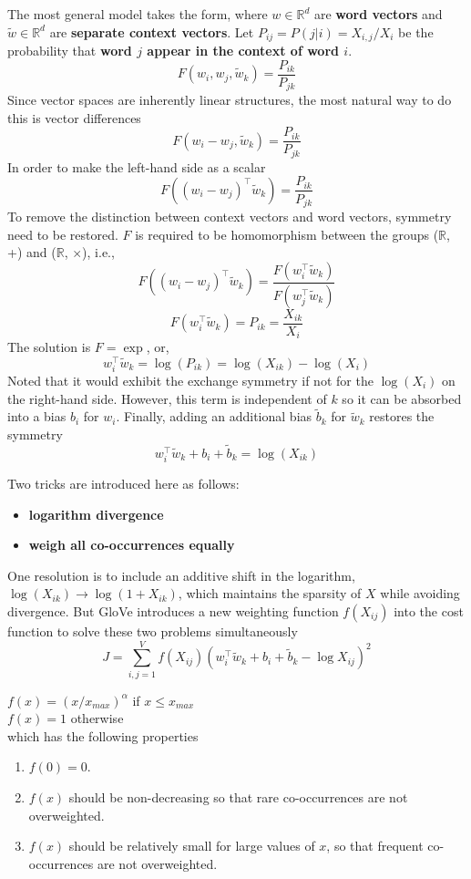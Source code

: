 \documentclass[a3paper, 12pt]{book} %
\begin{document}
The most general model takes the form, where $w \in \mathbb{R}^{d}$ are \textbf{word vectors} and $\tilde{w} \in \mathbb{R}^{d}$ are \textbf{separate context vectors}. Let $P_{ij}=P(j|i)=X_{i,j}/X_i$ be the probability that \textbf{word $j$ appear in the context of word $i$}.
$$F(w_i, w_j, \tilde{w}_k) = \frac{P_{ik}}{P_{jk}}$$
Since vector spaces are inherently linear structures, the most natural way to do this is vector differences
$$F(w_i-w_j, \tilde{w}_k) = \frac{P_{ik}}{P_{jk}}$$
In order to make the left-hand side as a scalar
$$F((w_i-w_j)^{\top}\tilde{w}_k) = \frac{P_{ik}}{P_{jk}}$$
To remove the distinction between context vectors and word vectors, symmetry need to be restored. $F$ is required to be homomorphism between the groups ($\mathbb{R}$, +) and ($\mathbb{R}$, $\times$), i.e.,
$$F((w_i-w_j)^{\top}\tilde{w}_k) = \frac{F(w_i^{\top}\tilde{w}_k)}{F(w_j^{\top}\tilde{w}_k)}$$
$$F(w_i^{\top}\tilde{w}_k) = P_{ik} = \frac{X_{ik}}{X_i}$$
The solution is $F=\exp$, or, 
$$ w_i^{\top}\tilde{w}_k = \log{(P_{ik})} = \log{(X_{ik})}-\log{(X_{i})}$$
Noted that it would exhibit the exchange symmetry if not for the $\log{(X_i)}$ on the right-hand side. However, this term is independent of $k$ so it can be absorbed into a bias $b_i$ for $w_i$. Finally, adding an additional bias $\tilde{b}_k$ for  $\tilde{w}_k$ restores the symmetry
$$ w_i^{\top}\tilde{w}_k +  b_i + \tilde{b}_k = \log{(X_{ik})}$$

Two tricks are introduced here as follows:
\begin{itemize}
	\item \textbf{logarithm divergence}
	\item \textbf{weigh all co-occurrences equally}
\end{itemize}
One resolution is to include an additive shift in the logarithm, $\log{(X_{ik})} \to \log{(1+X_{ik})}$, which maintains the sparsity of $X$ while avoiding divergence. But GloVe introduces a new weighting function $f(X_{ij})$ into the cost function to solve these two problems simultaneously
$$J=\sum_{i,j=1}^{V}{f(X_{ij})(w_i^{\top}\tilde{w}_k +  b_i + \tilde{b}_k - \log{X_{ij}})^2}$$

$f(x)=(x/x_{max})^\alpha$ if $x \le x_{max}$ \\
\indent $f(x)=1$ otherwise \\

which has the following properties
\begin{enumerate}
	\item $f(0)=0$.
	\item $f(x)$ should be non-decreasing so that rare co-occurrences are not overweighted.
	\item $f(x)$ should be relatively small for large values of $x$, so that frequent co-occurrences are
	not overweighted.
\end{enumerate}
\end{document}
